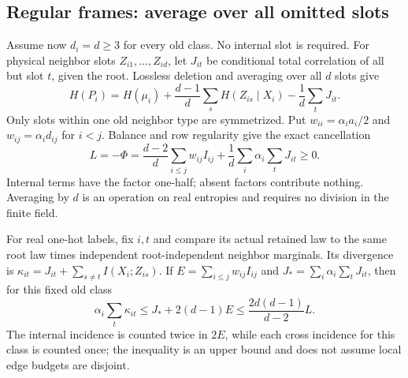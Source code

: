\subsection{Regular frames: average over all omitted slots}\label{sec:all-slot}
Assume now $d_i=d\ge3$ for every old class. No internal slot is
required. For physical neighbor slots $Z_{i1},\ldots,Z_{id}$, let
$J_{it}$ be conditional total correlation of all but slot $t$,
given the root. Lossless deletion and averaging over all $d$ slots give
\[
 H(P_i)=H(\mu_i)+\frac{d-1}{d}\sum_sH(Z_{is}\mid X_i)
                       -\frac1d\sum_tJ_{it}.
\]
Only slots within one old neighbor type are symmetrized. Put
$w_{ii}=\alpha_i a_i/2$ and $w_{ij}=\alpha_id_{ij}$ for $i<j$.
Balance and row regularity give the exact cancellation
\begin{equation}\label{eq:all-slot-entropy}
 L=-\Phi=\frac{d-2}{d}\sum_{i\le j}w_{ij}I_{ij}
                 +\frac1d\sum_i\alpha_i\sum_tJ_{it}\ge0.
\end{equation}
Internal terms have the factor one-half; absent factors contribute
nothing. Averaging by $d$ is an operation on real entropies and
requires no division in the finite field.

For real one-hot labels, fix $i,t$ and compare its actual retained
law to the same root law times independent root-independent neighbor
marginals. Its divergence is
$\kappa_{it}=J_{it}+\sum_{s\ne t}I(X_i;Z_{is})$.
If $E=\sum_{i\le j}w_{ij}I_{ij}$ and
$J_* =\sum_i\alpha_i\sum_tJ_{it}$, then for this fixed old class
\begin{equation}\label{eq:all-slot-KL}
 \alpha_i\sum_t\kappa_{it}
 \le J_*+2(d-1)E
 \le\frac{2d(d-1)}{d-2}L.
\end{equation}
The internal incidence is counted twice in $2E$, while each cross
incidence for this class is counted once; the inequality is an upper
bound and does not assume local edge budgets are disjoint.

